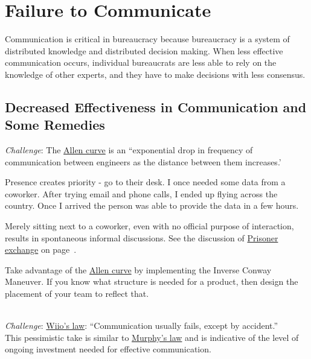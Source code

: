 \section{Failure to Communicate\label{sec:failure-to-comm}}

Communication is critical in bureaucracy because bureaucracy is a system of distributed knowledge and distributed decision making. When less effective communication occurs, individual bureaucrats are less able to rely on the knowledge of other experts, and they have to make decisions with less consensus. 

\subsection*{Decreased Effectiveness in Communication and Some Remedies}

\textit{Challenge}: The \href{https://en.wikipedia.org/wiki/Allen_curve}{Allen curve} 
is 
an ``exponential drop in frequency of communication between engineers as the distance between them increases.'

Presence creates priority - go to their desk. I once needed some data from a coworker. After trying email and phone calls, I ended up flying across the country. Once I arrived the person was able to provide the data in a few hours.

Merely sitting next to a coworker, even with no official purpose of interaction, results in spontaneous informal discussions. See the discussion of 
\hyperref[sec:prisoner-exchange]{Prisoner exchange} on 
page~\pageref{sec:prisoner-exchange}.

Take advantage of the \href{https://en.wikipedia.org/wiki/Allen_curve}{Allen curve} 
by implementing the Inverse Conway Maneuver. If you know what structure is needed for a product, then design the placement of your team to reflect that.

\ \\
\textit{Challenge}: \href{https://en.wikipedia.org/wiki/Wiio\%27s_laws}{Wiio's law}: 
``Communication usually fails, except by accident.''\\
This pessimistic take is similar to \href{https://en.wikipedia.org/wiki/Murphy\%27s_law}{Murphy's law}
and is indicative of the level of ongoing investment needed for effective communication. 

